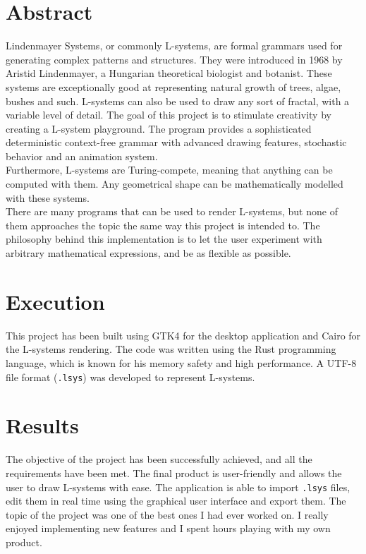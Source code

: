 \documentclass[a4paper]{article}
\begin{document}
\vspace{2cm}

\thispagestyle{empty} %

\section*{Abstract}

Lindenmayer Systems, or commonly L-systems,
are formal grammars used for generating complex patterns and structures.
They were introduced in 1968 by Aristid Lindenmayer, a Hungarian theoretical biologist and botanist.
These systems are exceptionally good at representing natural growth of trees, algae, bushes and such.
L-systems can also be used to draw any sort of fractal, with a variable level of detail.
The goal of this project is to stimulate creativity
by creating a L-system playground.
The program provides a sophisticated deterministic context-free grammar
with advanced drawing features, stochastic behavior and an animation system. \\
Furthermore, L-systems are Turing-compete, meaning that anything can be computed
with them.
Any geometrical shape can be mathematically modelled with these systems. \\
There are many programs that can be used to render L-systems, but none of them
approaches the topic the same way this project is intended to.
The philosophy behind this implementation is to let the user experiment
with arbitrary mathematical expressions, and be as flexible as possible.

\section*{Execution}

This project has been built using GTK4 for the desktop application
and Cairo for the L-systems rendering.
The code was written using the Rust programming language,
which is known for his memory safety and high performance.
A UTF-8 file format (\texttt{.lsys}) was developed to represent
L-systems.


\section*{Results}

The objective of the project has been successfully achieved, and all the requirements have been met.
The final product is user-friendly and allows the user to draw L-systems with ease.
The application is able to import \texttt{.lsys} files,
edit them in real time using the graphical user interface and export them.
The topic of the project was one of the best ones I had ever worked on.
I really enjoyed implementing new features and I spent hours playing
with my own product.
\end{document}
